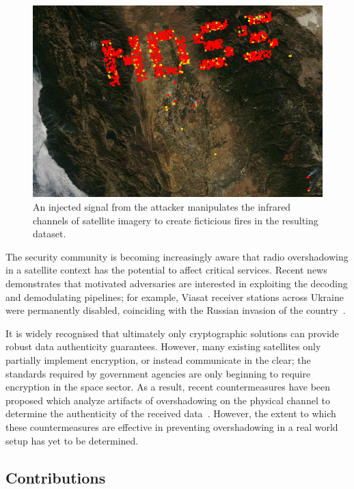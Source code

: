 \begin{figure}
    \includegraphics[width=\columnwidth]{diagrams/injection/pixels_800_140.jpg}
    \caption{An injected signal from the attacker manipulates the infrared channels of satellite imagery to create ficticious fires in the resulting dataset.}
    \label{fig:location-injection}
\end{figure}

The security community is becoming increasingly aware that radio overshadowing in a satellite context has the potential to affect critical services.
Recent news demonstrates that motivated adversaries are interested in exploiting the decoding and demodulating pipelines; for example, Viasat receiver stations across Ukraine were permanently disabled, coinciding with the Russian invasion of the country~\cite{satcomAnalysis}. %

It is widely recognised that ultimately only cryptographic solutions can provide robust data authenticity guarantees.
However, many existing satellites only partially implement encryption, or instead communicate in the clear; the standards required by government agencies are only beginning to require encryption in the space sector.
As a result, recent countermeasures have been proposed which analyze artifacts of overshadowing on the physical channel to determine the authenticity of the received data~\cite{jedermann2021orbit,oligeri2020past}.
However, the extent to which these countermeasures are effective in preventing overshadowing in a real world setup has yet to be determined.

\subsection{Contributions}

